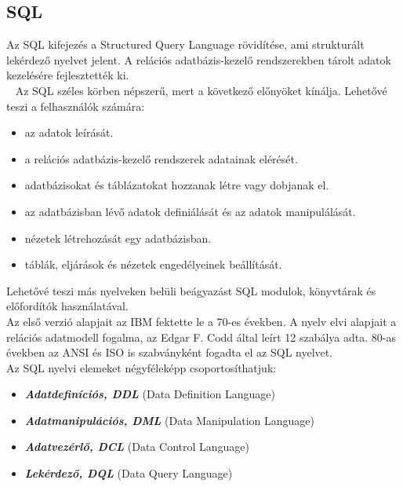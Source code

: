 \documentclass[tikz,12pt,margin=0px]{article}
\begin{document}
	\subsection*{SQL\\}

    \noindent Az SQL kifejezés a Structured Query Language rövidítése, ami strukturált lekérdező nyelvet jelent. A relációs adatbázis-kezelő rendszerekben tárolt adatok kezelésére fejlesztették ki.\\\
\newpage	
    \noindent Az SQL széles körben népszerű, mert a következő előnyöket kínálja.
    Lehetővé teszi a felhasználók számára:
    \begin{itemize}
        \item az adatok leírását.
        \item a relációs adatbázis-kezelő rendszerek adatainak elérését.
        \item adatbázisokat és táblázatokat hozzanak létre vagy dobjanak el.
        \item az adatbázisban lévő adatok definiálását és az adatok manipulálását.
        \item nézetek létrehozását egy adatbázisban.
        \item táblák, eljárások és nézetek engedélyeinek beállítását.
    \end{itemize}

    \noindent Lehetővé teszi más nyelveken belüli beágyazást SQL modulok, könyvtárak és előfordítók használatával.\\

    \noindent Az első verzió alapjait az IBM fektette le a 70-es években. A nyelv elvi alapjait a relációs adatmodell fogalma, az Edgar F. Codd által leírt 12 szabálya adta. 80-as években az ANSI és ISO is szabványként fogadta el az SQL nyelvet.\\

    \noindent Az SQL nyelvi elemeket négyféleképp csoportosíthatjuk:
    \begin{itemize}
        \item \textbf{\emph{Adatdefiníciós, DDL}} (Data Definition Language)
        \item \textbf{\emph{Adatmanipulációs, DML}} (Data Manipulation Language)
        \item \textbf{\emph{Adatvezérlő, DCL}} (Data Control Language)
        \item \textbf{\emph{Lekérdező, DQL}} (Data Query Language)\\
    \end{itemize}
\end{document}

